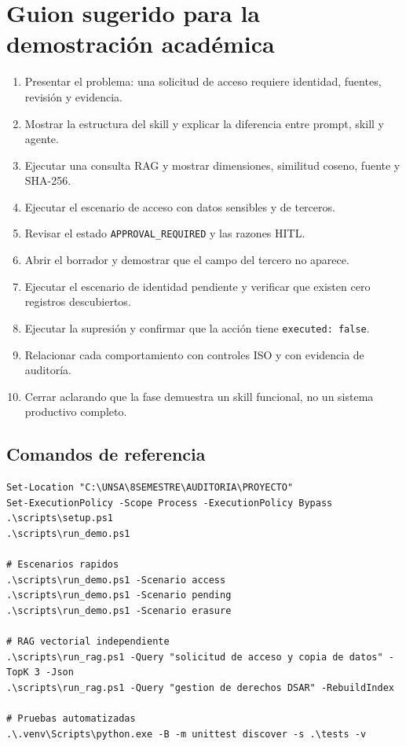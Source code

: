\documentclass[11pt,a4paper]{article}
\begin{document}
\section{Guion sugerido para la demostración académica}

\begin{enumerate}[label=\textbf{Paso \arabic*.},leftmargin=2.2cm]
  \item Presentar el problema: una solicitud de acceso requiere identidad, fuentes, revisión y evidencia.
  \item Mostrar la estructura del skill y explicar la diferencia entre prompt, skill y agente.
  \item Ejecutar una consulta RAG y mostrar dimensiones, similitud coseno, fuente y SHA-256.
  \item Ejecutar el escenario de acceso con datos sensibles y de terceros.
  \item Revisar el estado \texttt{APPROVAL\_REQUIRED} y las razones HITL.
  \item Abrir el borrador y demostrar que el campo del tercero no aparece.
  \item Ejecutar el escenario de identidad pendiente y verificar que existen cero registros descubiertos.
  \item Ejecutar la supresión y confirmar que la acción tiene \texttt{executed: false}.
  \item Relacionar cada comportamiento con controles ISO y con evidencia de auditoría.
  \item Cerrar aclarando que la fase demuestra un skill funcional, no un sistema productivo completo.
\end{enumerate}

\subsection{Comandos de referencia}

\begin{lstlisting}[language={},caption={Ejecución de la simulación en Windows PowerShell.}]
Set-Location "C:\UNSA\8SEMESTRE\AUDITORIA\PROYECTO"
Set-ExecutionPolicy -Scope Process -ExecutionPolicy Bypass
.\scripts\setup.ps1
.\scripts\run_demo.ps1

# Escenarios rapidos
.\scripts\run_demo.ps1 -Scenario access
.\scripts\run_demo.ps1 -Scenario pending
.\scripts\run_demo.ps1 -Scenario erasure

# RAG vectorial independiente
.\scripts\run_rag.ps1 -Query "solicitud de acceso y copia de datos" -TopK 3 -Json
.\scripts\run_rag.ps1 -Query "gestion de derechos DSAR" -RebuildIndex

# Pruebas automatizadas
.\.venv\Scripts\python.exe -B -m unittest discover -s .\tests -v
\end{lstlisting}
\end{document}
